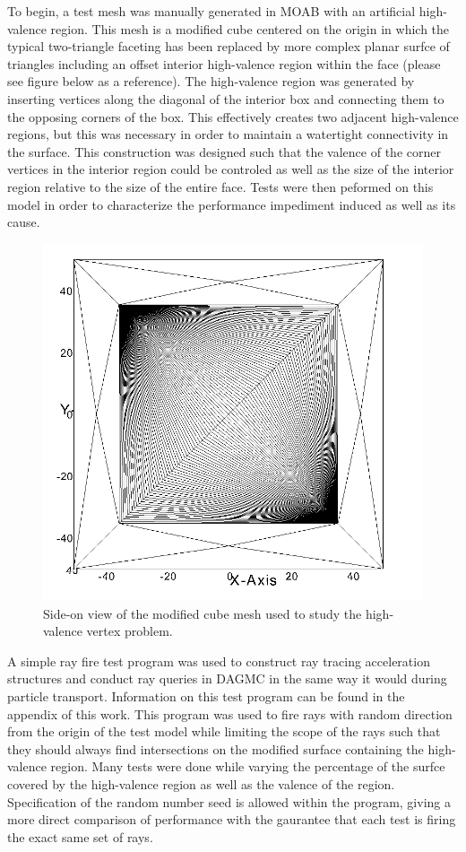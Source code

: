 \documentclass[12pt, a4paper]{article}
\begin{document}
To begin, a test mesh was manually generated in MOAB with an artificial high-valence region. This mesh is a modified cube centered on the origin in which the typical two-triangle faceting has been replaced by more complex planar surfce of triangles including an offset interior high-valence region within the face (please see figure below as a reference). The high-valence region was generated by inserting vertices along the diagonal of the interior box and connecting them to the opposing corners of the box. This effectively creates two adjacent high-valence regions, but this was necessary in order to maintain a watertight connectivity in the surface. This construction was designed such that the valence of the corner vertices in the interior region could be controled as well as the size of the interior region relative to the size of the entire face. Tests were then peformed on this model in order to characterize the performance impediment induced as well as its cause.

\begin{figure}[H]
  \centering
    \includegraphics[scale=0.2]{hv_study_design.png}
    \caption{Side-on view of the modified cube mesh used to study the high-valence vertex problem.}
\end{figure}

A simple ray fire test program was used to construct ray tracing acceleration structures and conduct ray queries in DAGMC in the same way it would during particle transport. Information on this test program can be found in the appendix of this work. This program was used to fire rays with random direction from the origin of the test model while limiting the scope of the rays such that they should always find intersections on the modified surface containing the high-valence region. Many tests were done while varying the percentage of the surfce covered by the high-valence region as well as the valence of the region. Specification of the random number seed is allowed within the program, giving a more direct comparison of performance with the gaurantee that each test is firing the exact same set of rays.
\end{document}
